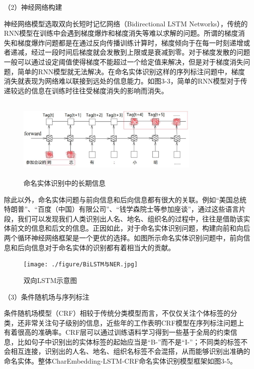 \documentclass[winfonts,master,oneside,nobackinfo]{njuthesis}
\begin{document}
（2）神经网络构建

神经网络模型选取双向长短时记忆网络（Bidirectional LSTM Networks），传统的RNN模型在训练中会遇到梯度爆炸和梯度消失等难以求解的问题。所谓的梯度消失和梯度爆炸问题都是在通过反向传播训练计算时，梯度倾向于在每一时刻递增或者递减，经过一段时间后梯度就会发散到上限或是衰减到零。对于梯度发散的问题一般可以通过设定阈值使得梯度不能超过一个给定值来解决，但是对于梯度消失问题，简单的RNN模型就无法解决。在命名实体识别这样的序列标注问题中，梯度消失就表现为网络难以联接到远处的信息能力。如图3-3，简单的RNN模型对于传递较远的信息在训练时往往受梯度消失的影响而消失。

\begin{figure}[H]
\centering
\begin{minipage}[t]{\textwidth}
\includegraphics[width=0.8\textwidth,height=4cm]{./figure/命名实体识别长期信息.jpg}
\caption{命名实体识别中的长期信息}
\label{lab:1}
\end{minipage}
\end{figure}


除此以外，命名实体问题与前向信息和后向信息都有很大的关联。例如“美国总统特朗普”、“百度（中国）有限公司”、“钱学森院士等参加座谈”，通过这些语言片段，我们可以发现我们人类识别出人名、地名、组织名的过程中，往往是借助该实体前文的信息和后文的信息。正因如此，对于命名实体识别问题，构建向前和向后两个循环神经网络框架是一个更优的选择。如图所示命名实体识别问题中，前向信息和后向信息对于命名实体的识别都有着相当大的贡献。

\begin{figure}[h]
\centering
\begin{minipage}[t]{\textwidth}
\texttt{[image: ./figure/BiLSTM与NER.jpg]}
\caption{双向LSTM示意图}
\label{lab:1}
\end{minipage}
\end{figure}

（3）条件随机场与序列标注

条件随机场模型（CRF）相较于传统分类模型而言，不仅仅关注个体标签的分类，还非常关注句子级别的信息，近些年的工作表明CRF模型在序列标注问题上有着很高的准确率。CRF层可以通过训练语料学习得到一些基于全局的约束信息，比如句子中识别出的实体标签的起始应当是“B-”而不是“I-”；不同类的标签不会相互连接，识别出的人名、地名、组织名标签不会混搭，从而能够识别出准确的命名实体。整体CharEmbedding-LSTM-CRF命名实体识别模型框架如图3-5。
\end{document}
